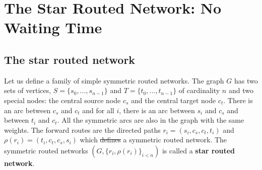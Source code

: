 \documentclass[10pt, conference, letterpaper]{IEEEtran}
\providecommand{\DIFaddtex}[1]{{\protect\color{blue}\uwave{#1}}} %
\providecommand{\DIFdeltex}[1]{{\protect\color{red}\sout{#1}}}                      %
\providecommand{\DIFaddbegin}{} %
\providecommand{\DIFaddend}{} %
\providecommand{\DIFdelbegin}{} %
\providecommand{\DIFdelend}{} %
\providecommand{\DIFadd}[1]{\texorpdfstring{\DIFaddtex{#1}}{#1}} %
\providecommand{\DIFdel}[1]{\texorpdfstring{\DIFdeltex{#1}}{}} %
\newcommand{\DIFscaledelfig}{0.5}
\newlength{\DIFdelgraphicswidth} %
\newlength{\DIFdelgraphicsheight} %
\newcommand{\DIFaddincludegraphics}[2][]{{\color{blue}\fbox{\DIFOincludegraphics[#1]{#2}}}} %
\newcommand{\DIFdelincludegraphics}[2][]{%
\sbox{\DIFdelgraphicsbox}{\DIFOincludegraphics[#1]{#2}}%
\settoboxwidth{\DIFdelgraphicswidth}{\DIFdelgraphicsbox} %
\settoboxtotalheight{\DIFdelgraphicsheight}{\DIFdelgraphicsbox} %
\scalebox{\DIFscaledelfig}{%
\parbox[b]{\DIFdelgraphicswidth}{\usebox{\DIFdelgraphicsbox}\\[-\baselineskip] \rule{\DIFdelgraphicswidth}{0em}}\llap{\resizebox{\DIFdelgraphicswidth}{\DIFdelgraphicsheight}{%
\setlength{\unitlength}{\DIFdelgraphicswidth}%
\begin{picture}(1,1)%
\thicklines\linethickness{2pt} %
{\color[rgb]{1,0,0}\put(0,0){\framebox(1,1){}}}%
{\color[rgb]{1,0,0}\put(0,0){\line( 1,1){1}}}%
{\color[rgb]{1,0,0}\put(0,1){\line(1,-1){1}}}%
\end{picture}%
}\hspace*{3pt}}} %
} %
\DeclareRobustCommand{\DIFaddbegin}{\DIFOaddbegin \let\includegraphics\DIFaddincludegraphics} %
\DeclareRobustCommand{\DIFaddend}{\DIFOaddend \let\includegraphics\DIFOincludegraphics} %
\DeclareRobustCommand{\DIFdelbegin}{\DIFOdelbegin \let\includegraphics\DIFdelincludegraphics} %
\DeclareRobustCommand{\DIFdelend}{\DIFOaddend \let\includegraphics\DIFOincludegraphics} %
\begin{document}
\section{The Star Routed Network: No Waiting Time} \label{sec:PAZL}

   
    
    \subsection{The star routed network}

      Let us define a family of simple symmetric routed networks. 
      The graph $G$ has two sets of vertices, $S=\{s_0,...,s_{n-1}\}$ and $T=\{t_0,...,t_{n-1}\}$ of cardinality $n$ and two special nodes:
      the central source node {\bf $c_s$} and the central target node {\bf $c_t$}.
      There is an arc between {\bf $c_s$} and {\bf $c_t$} and for all $i$, there is an arc between $s_i$ and $c_s$ and between $t_i$ and $c_t$.
      All the symmetric arcs are also in the graph with the same weights.
      The forward routes are the directed paths $r_i = (s_i,c_s,c_t,t_i)$ and $\rho(r_i) = (t_i,c_t,c_s,s_i)$ which \DIFdelbegin \DIFdel{defines }\DIFdelend \DIFaddbegin \DIFadd{define }\DIFaddend a symmetric routed network. 
      The symmetric routed networks $(G, \{r_i,\rho(r_i)\}_{i<n})$ is called a \textbf{star routed network}. \DIFdelbegin %
\end{document}
